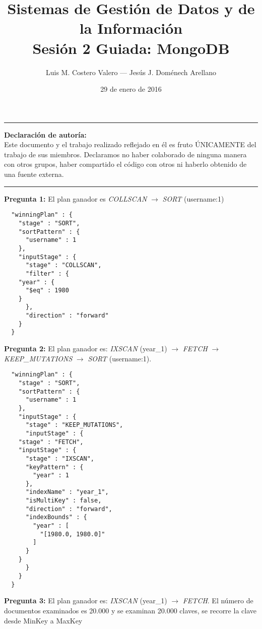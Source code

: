 \documentclass[11pt,a4paper]{article}
\title{Sistemas de Gestión de Datos y de la Información\\Sesión 2 Guiada:
  MongoDB}
\author{Luis M. Costero Valero --- Jesús J. Doménech Arellano}
\date{29 de enero de 2016}
\begin{document}
 
\maketitle

\hrule
\textbf{Declaración de autoría:}\\Este documento y el trabajo realizado
 reflejado en él es fruto ÚNICAMENTE del trabajo de sus miembros. Declaramos
 no haber colaborado de ninguna manera con otros grupos, haber compartido el
 código con otros ni haberlo obtenido de una fuente externa.\\
\hrule
\vspace{2cm}
\textbf{Pregunta 1:} El plan ganador es \emph{COLLSCAN} $\rightarrow$
\emph{SORT} (username:1)
\begin{lstlisting}
  "winningPlan" : {
    "stage" : "SORT",
    "sortPattern" : {
      "username" : 1
    },
    "inputStage" : {
      "stage" : "COLLSCAN",
      "filter" : {
	"year" : {
	  "$eq" : 1980
	}
      },
      "direction" : "forward"
    }
  }
\end{lstlisting}
\textbf{Pregunta 2:} El plan ganador es: \emph{IXSCAN} (year\_1)
$\rightarrow$ \emph{FETCH} $\rightarrow$ \emph{KEEP\_MUTATIONS}
$\rightarrow$ \emph{SORT} (username:1).
\begin{lstlisting}
  "winningPlan" : {
    "stage" : "SORT",
    "sortPattern" : {
      "username" : 1
    },
    "inputStage" : {
      "stage" : "KEEP_MUTATIONS",
      "inputStage" : {
	"stage" : "FETCH",
	"inputStage" : {
	  "stage" : "IXSCAN",
	  "keyPattern" : {
	    "year" : 1
	  },
	  "indexName" : "year_1",
	  "isMultiKey" : false,
	  "direction" : "forward",
	  "indexBounds" : {
	    "year" : [
	      "[1980.0, 1980.0]"
	    ]
	  }
	}
      }
    }
  }
\end{lstlisting}

\textbf{Pregunta 3:} El plan ganador es: \emph{IXSCAN} (year\_1) $\rightarrow$
\emph{FETCH}. El número de documentos examinados es 20.000 y se examinan
20.000 claves, se recorre la clave desde MinKey a MaxKey
\end{document}
